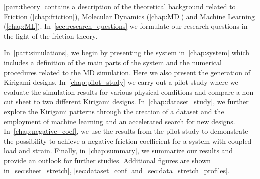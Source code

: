 \cref{part:theory} contains a description of the theoretical background related
to Friction (\cref{chap:friction}), Molecular Dynamics (\cref{chap:MD}) and
Machine Learning (\cref{chap:ML}). In~\cref{sec:research_questions} we
formulate our research questions in the light of the friction theory.  

In~\cref{part:simulations}, we begin by presenting the system in~\cref{chap:system} which includes a definition of the main parts of the system and the numerical procedures related to the \acrshort{MD} simulation. Here we also present the generation of Kirigami designs. In~\cref{chap:pilot_study} we carry out a pilot
study where we evaluate the simulation results for
various physical conditions and compare a non-cut sheet to two different
Kirigami designs. In~\cref{chap:dataset_study}, we further explore the Kirigami patterns through the creation of a
dataset and the employment of machine learning and an accelerated search for new designs. In~\cref{chap:negative_coef}, we use
the results from the pilot study to demonstrate the possibility to achieve a
negative friction coefficient for a system with coupled load and strain. Finally, in~\cref{chap:summary}, we summarize our results and provide an outlook for further studies. Additional figures are shown
in~\cref{sec:sheet_stretch}, \cref{sec:dataset_conf} and~\cref{sec:data_stretch_profiles}. 

